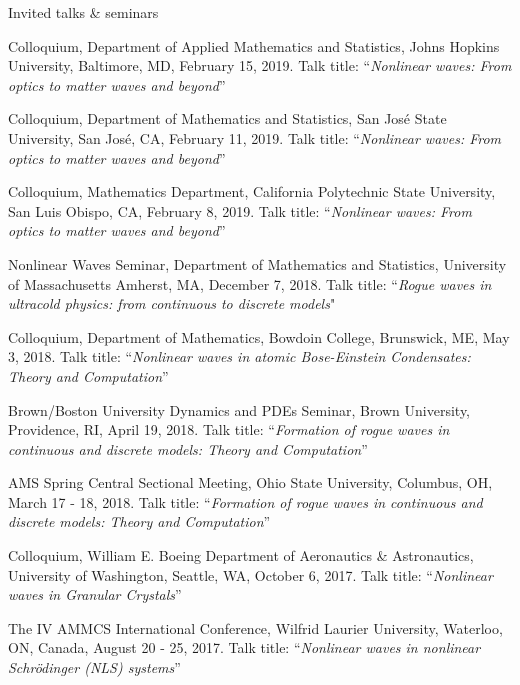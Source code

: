 \documentclass[10pt]{article} %
\begin{document}
\begin{section}{Invited talks \& seminars}
\begin{etaremune}
\item   Colloquium, Department of Applied Mathematics and Statistics, Johns Hopkins University, Baltimore, MD, February 15, 2019.
       Talk title: ``\textit{Nonlinear waves: From optics to matter waves and beyond}''        
        
\item   Colloquium, Department of Mathematics and Statistics, San Jos\'e State University, San Jos\'e, CA, February 11, 2019.
       Talk title: ``\textit{Nonlinear waves: From optics to matter waves and beyond}''
        
\item   Colloquium, Mathematics Department, California Polytechnic State University, San Luis Obispo, CA, February 8, 2019.
       Talk title: ``\textit{Nonlinear waves: From optics to matter waves and beyond}''        
        
\item   Nonlinear Waves Seminar, Department of Mathematics and Statistics, University of Massachusetts Amherst, MA, December 7, 2018.
        Talk title: ``\textit{Rogue waves in ultracold physics: from continuous to discrete models}"        
        
\item   Colloquium, Department of Mathematics, Bowdoin College, Brunswick, ME, May 3, 2018.
        Talk title: ``\textit{Nonlinear waves in atomic Bose-Einstein Condensates: Theory and Computation}''
       
\item   Brown/Boston University Dynamics and PDEs Seminar, Brown University, Providence, RI, April 19, 2018.
        Talk title: ``\textit{Formation of rogue waves in continuous and discrete models: Theory and Computation}''

\item   AMS Spring Central Sectional Meeting, Ohio State University, Columbus, OH, March 17 - 18, 2018.
        Talk title: ``\textit{Formation of rogue waves in continuous and discrete models: Theory and Computation}''                
                     
\item   Colloquium, William E. Boeing Department of Aeronautics \& Astronautics, University of Washington, Seattle, WA, October 6, 2017.
        Talk title: ``\textit{Nonlinear waves in Granular Crystals}''
    
\item   The IV AMMCS International Conference, Wilfrid Laurier University, Waterloo, ON, Canada, August 20 - 25, 2017. 
        Talk title: ``\textit{Nonlinear waves in nonlinear Schr\"odinger (NLS) systems}''


\end{etaremune}
\end{section}
\end{document}
